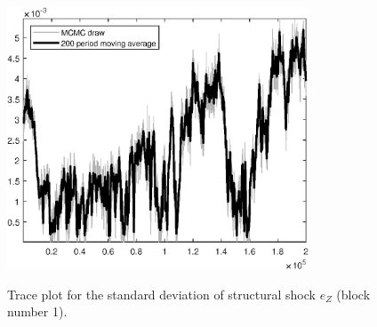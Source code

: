 \begin{figure}[H]
\centering
  \includegraphics[width=0.8\textwidth]{BRS_sectoral_rest/graphs/TracePlot_SE_e_Z_blck_1}\\
    \caption{Trace plot for the standard deviation of structural shock ${e_Z}$ (block number 1).}
\end{figure}
